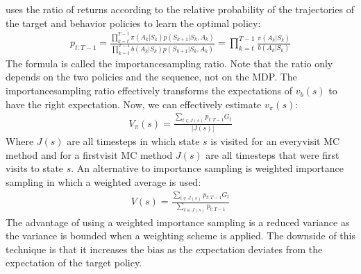 \documentclass[letterpaper,10pt,english]{jupyterBook}
\begin{document}
uses the ratio of returns according to the relative probability of the trajectories of the target and behavior policies to learn the optimal policy:
\begin{equation*}
\begin{split} p_{t:T-1} = \frac{\prod^{T-1}_{k=t} \pi(A_k|S_k)p(S_{k+1}|S_k, A_k)}{\prod_{k=t}^{T-1}b(A_k|S_k)p(S_{k+1}|S_k,A_k)} = \prod_{k=t}^{T-1}\frac{\pi(A_k|S_k)}{b(A_k|S_k)}\end{split}
\end{equation*}
\sphinxAtStartPar
The formula is called the importance\sphinxhyphen{}sampling ratio. Note that the ratio only depends on the two policies and the sequence, not on the MDP. The importance\sphinxhyphen{}sampling ratio effectively transforms the expectations of \(v_b(s)\) to have the right expectation.  Now, we can effectively estimate \(v_{\pi}(s)\):
\begin{equation*}
\begin{split}V_{\pi}(s) = \frac{\sum_{t\in J(s)} p_{t:T-1}G_t}{|J(s)|}\end{split}
\end{equation*}
\sphinxAtStartPar
Where \(J(s)\) are all timesteps in which state \(s\) is visited for an every\sphinxhyphen{}visit MC method and for a first\sphinxhyphen{}visit MC method \(J(s)\) are all timesteps that were first visits to state \(s\). An alternative to importance sampling is weighted importance sampling in which a weighted average is used:
\begin{equation*}
\begin{split} V(s) = \frac{\sum_{t \in J(s)}p_{t:T-1}G_t}{\sum_{t \in J(s)}p_{t:T-1}} \end{split}
\end{equation*}
\sphinxAtStartPar
The advantage of using a weighted importance sampling is a reduced variance as the variance is bounded when a weighting scheme is applied. The downside of this technique is that it increases the bias as the expectation deviates from the expectation of the target policy.
\end{document}
